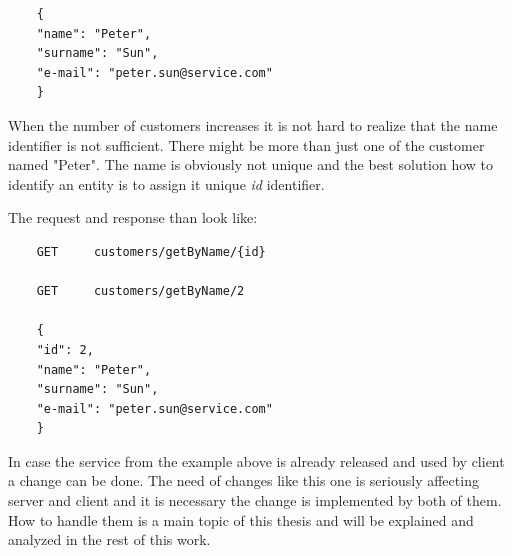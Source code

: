\begin{lstlisting}
    { 
    "name": "Peter",
    "surname": "Sun",
    "e-mail": "peter.sun@service.com" 
    }
\end{lstlisting}

When the number of customers increases it is not hard to realize that the name identifier is not sufficient. There might be more than just one of the customer named "Peter". The name is obviously not unique and the best solution how to identify an entity is to assign it unique \emph{id} identifier. 

The request and response than look like:
\begin{lstlisting}
    GET     customers/getByName/{id} 
    
    GET     customers/getByName/2 
    
    { 
    "id": 2,
    "name": "Peter",
    "surname": "Sun",
    "e-mail": "peter.sun@service.com" 
    }
\end{lstlisting}


In case the service from the example above is already released and used by client a change can be done. The need of changes like this one is seriously affecting server and client and it is necessary the change is implemented by both of them. How to handle them is a main topic of this thesis and will be explained and analyzed in the rest of this work.
